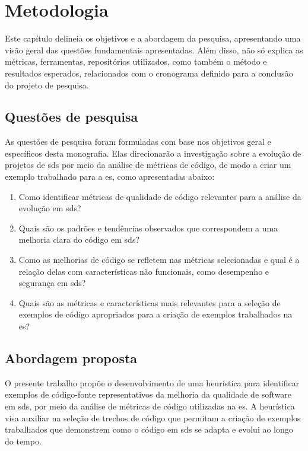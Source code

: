 
\chapter{Metodologia}\label{cap:Metodologia}
Este capítulo delineia os objetivos e a abordagem da pesquisa, apresentando uma visão geral das questões fundamentais apresentadas. Além disso, não só explica as métricas, ferramentas, repositórios utilizados, como também o método e resultados esperados, relacionados com o cronograma definido para a conclusão do projeto de pesquisa.

\section{Questões de pesquisa}
As questões de pesquisa foram formuladas com base nos objetivos geral e específicos desta monografia. Elas direcionarão a investigação sobre a evolução de projetos de \gls{sds} por meio da análise de métricas de código, de modo a criar um exemplo trabalhado para a \gls{es}, como apresentadas abaixo:

\begin{enumerate}
    \item Como identificar métricas de qualidade de código relevantes para a análise da evolução em \gls{sds}?
    
    \item Quais são os padrões e tendências observados que correspondem a uma melhoria clara do código em \gls{sds}?
    
    \item Como as melhorias de código se refletem nas métricas selecionadas e qual é a relação delas com características não funcionais, como desempenho e segurança em \gls{sds}?
    
    \item Quais são as métricas e características mais relevantes para a seleção de exemplos de código apropriados para a criação de exemplos trabalhados na \gls{es}?
\end{enumerate}

\section{Abordagem proposta}

O presente trabalho propõe o desenvolvimento de uma heurística para identificar exemplos de código-fonte representativos da melhoria da qualidade de software em \gls{sds}, por meio da análise de métricas de código utilizadas na \gls{es}. A heurística visa auxiliar na seleção de trechos de código que permitam a criação de exemplos trabalhados que demonstrem como o código em \gls{sds} se adapta e evolui ao longo do tempo.

